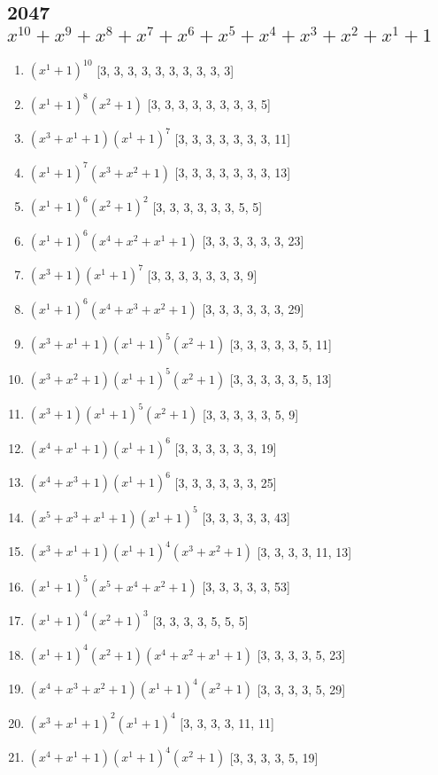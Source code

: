\documentclass[10pt,twocolumn]{article}
\begin{document}
\subsection*{2047$x^{10} + x^{9} + x^{8} + x^{7} + x^{6} + x^{5} + x^{4} + x^{3} + x^{2} + x^{1} + 1$  } 
\begin{enumerate}
\item $(x^{1} + 1)^{10}$  [3, 3, 3, 3, 3, 3, 3, 3, 3, 3]
\item $(x^{1} + 1)^{8}(x^{2} + 1)$  [3, 3, 3, 3, 3, 3, 3, 3, 5]
\item $(x^{3} + x^{1} + 1)(x^{1} + 1)^{7}$  [3, 3, 3, 3, 3, 3, 3, 11]
\item $(x^{1} + 1)^{7}(x^{3} + x^{2} + 1)$  [3, 3, 3, 3, 3, 3, 3, 13]
\item $(x^{1} + 1)^{6}(x^{2} + 1)^{2}$  [3, 3, 3, 3, 3, 3, 5, 5]
\item $(x^{1} + 1)^{6}(x^{4} + x^{2} + x^{1} + 1)$  [3, 3, 3, 3, 3, 3, 23]
\item $(x^{3} + 1)(x^{1} + 1)^{7}$  [3, 3, 3, 3, 3, 3, 3, 9]
\item $(x^{1} + 1)^{6}(x^{4} + x^{3} + x^{2} + 1)$  [3, 3, 3, 3, 3, 3, 29]
\item $(x^{3} + x^{1} + 1)(x^{1} + 1)^{5}(x^{2} + 1)$  [3, 3, 3, 3, 3, 5, 11]
\item $(x^{3} + x^{2} + 1)(x^{1} + 1)^{5}(x^{2} + 1)$  [3, 3, 3, 3, 3, 5, 13]
\item $(x^{3} + 1)(x^{1} + 1)^{5}(x^{2} + 1)$  [3, 3, 3, 3, 3, 5, 9]
\item $(x^{4} + x^{1} + 1)(x^{1} + 1)^{6}$  [3, 3, 3, 3, 3, 3, 19]
\item $(x^{4} + x^{3} + 1)(x^{1} + 1)^{6}$  [3, 3, 3, 3, 3, 3, 25]
\item $(x^{5} + x^{3} + x^{1} + 1)(x^{1} + 1)^{5}$  [3, 3, 3, 3, 3, 43]
\item $(x^{3} + x^{1} + 1)(x^{1} + 1)^{4}(x^{3} + x^{2} + 1)$  [3, 3, 3, 3, 11, 13]
\item $(x^{1} + 1)^{5}(x^{5} + x^{4} + x^{2} + 1)$  [3, 3, 3, 3, 3, 53]
\item $(x^{1} + 1)^{4}(x^{2} + 1)^{3}$  [3, 3, 3, 3, 5, 5, 5]
\item $(x^{1} + 1)^{4}(x^{2} + 1)(x^{4} + x^{2} + x^{1} + 1)$  [3, 3, 3, 3, 5, 23]
\item $(x^{4} + x^{3} + x^{2} + 1)(x^{1} + 1)^{4}(x^{2} + 1)$  [3, 3, 3, 3, 5, 29]
\item $(x^{3} + x^{1} + 1)^{2}(x^{1} + 1)^{4}$  [3, 3, 3, 3, 11, 11]
\item $(x^{4} + x^{1} + 1)(x^{1} + 1)^{4}(x^{2} + 1)$  [3, 3, 3, 3, 5, 19]

\end{enumerate}
\end{document}
